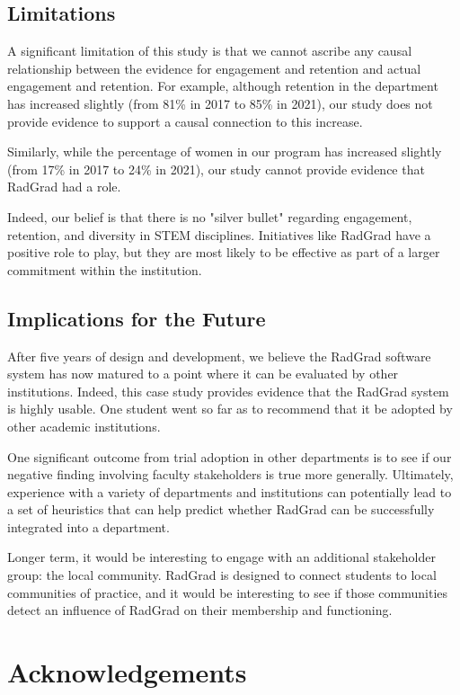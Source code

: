 \documentclass[acmsmall,nonacm]{acmart}
\begin{document}
\subsection{Limitations}

A significant limitation of this study is that we cannot ascribe any causal relationship between the evidence for engagement and retention and actual engagement and retention. For example, although retention in the department has increased slightly (from 81\% in 2017 to 85\% in 2021), our study does not provide evidence to support a causal connection to this increase.

Similarly, while the percentage of women in our program has increased slightly (from 17\% in 2017 to 24\% in 2021), our study cannot provide evidence that RadGrad had a role.

Indeed, our belief is that there is no "silver bullet" regarding engagement, retention, and diversity in STEM disciplines. Initiatives like RadGrad have a positive role to play, but they are most likely to be effective as part of a larger commitment within the institution.

\subsection{Implications for the Future}

After five years of design and development, we believe the RadGrad software system has now matured to a point where it can be evaluated by other institutions. Indeed, this case study provides evidence that the RadGrad system is highly usable. One student went so far as to recommend that it be adopted by other academic institutions.

One significant outcome from trial adoption in other departments is to see if our negative finding involving faculty stakeholders is true more generally. Ultimately, experience with a variety of departments and institutions can potentially lead to a set of heuristics that can help predict whether RadGrad can be successfully integrated into a department.

Longer term, it would be interesting to engage with an additional stakeholder group: the local community. RadGrad is designed to connect students to local communities of practice, and it would be interesting to see if those communities detect an influence of RadGrad on their membership and functioning.

\section{Acknowledgements}
\end{document}
